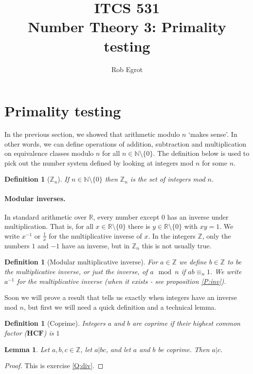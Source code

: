 \documentclass{article}
\title{ITCS 531 \\Number Theory 3: Primality testing}
\author{Rob Egrot}
\date{}
\theoremstyle{plain}
\newtheorem{definition}[theorem]{Definition}{\bfseries}{\upshape}
\newtheorem{lemma}[theorem]{Lemma}{\bfseries}{\upshape}
\newcommand{\bN}{\mathbb{N}}
\newcommand{\bZ}{\mathbb{Z}}
\newcommand{\bR}{\mathbb{R}}
\newcommand{\HCF}{\mathbf{HCF}}
\begin{document}
\maketitle

\section{Primality testing}
In the previous section, we showed that arithmetic modulo $n$ `makes sense'. In other words, we can define operations of addition, subtraction and multiplication on equivalence classes modulo $n$ for all $n\in\bN \setminus\{0\}$. The definition below is used to pick out the number system defined by looking at integers mod $n$ for some $n$. 

\begin{definition}[$\bZ_n$]
If $n\in \bN\setminus\{0\}$ then $\bZ_n$ is the set of integers mod $n$.
\end{definition}

\paragraph{Modular inverses.} In standard arithmetic over $\bR$, every number except $0$ has an inverse under multiplication. That is, for all $x\in \bR\setminus\{0\}$ there is $y\in \bR\setminus\{0\}$ with $xy =1$. We write $x^{-1}$ or $\frac{1}{x}$ for the multiplicative inverse of $x$. In the integers $\bZ$, only the numbers $1$ and $-1$ have an inverse, but in $\bZ_n$ this is not usually true.

\begin{definition}[Modular multiplicative inverse] 
For $a\in \bZ$ we define $b\in\bZ$ to be the multiplicative inverse, or just the \emph{inverse}, of $a \mod n$ if  $ab \equiv_n 1$. We write $a^{-1}$ for the multiplicative inverse (when it exists - see proposition \ref{P:inv}).
\end{definition}

Soon we will prove a result that tells us exactly when integers have an inverse mod $n$, but first we will need a quick definition and a technical lemma.

\begin{definition}[Coprime]
Integers $a$ and $b$ are \emph{coprime} if their highest common factor ($\HCF$)  is $1$
\end{definition}

\begin{lemma}\label{L:div3}
Let $a,b,c\in\bZ$, let $a|bc$, and let $a$ and $b$ be coprime. Then $a|c$.
\end{lemma}
\begin{proof}
This is exercise \ref{Q:div}.
\end{proof}
\end{document}
